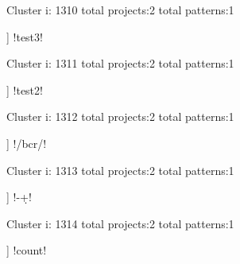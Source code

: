 Cluster i: 1310
total projects:2
total patterns:1
\begin{multicols}{1}
\begin{description}[noitemsep,topsep=0pt]
\item [[2] ] \cverb!test3!
\end{description}
\end{multicols}







Cluster i: 1311
total projects:2
total patterns:1
\begin{multicols}{1}
\begin{description}[noitemsep,topsep=0pt]
\item [[2] ] \cverb!test2!
\end{description}
\end{multicols}







Cluster i: 1312
total projects:2
total patterns:1
\begin{multicols}{1}
\begin{description}[noitemsep,topsep=0pt]
\item [[2] ] \cverb!/bcr/!
\end{description}
\end{multicols}







Cluster i: 1313
total projects:2
total patterns:1
\begin{multicols}{1}
\begin{description}[noitemsep,topsep=0pt]
\item [[2] ] \cverb!-\d+!
\end{description}
\end{multicols}







Cluster i: 1314
total projects:2
total patterns:1
\begin{multicols}{1}
\begin{description}[noitemsep,topsep=0pt]
\item [[2] ] \cverb!count!
\end{description}
\end{multicols}







